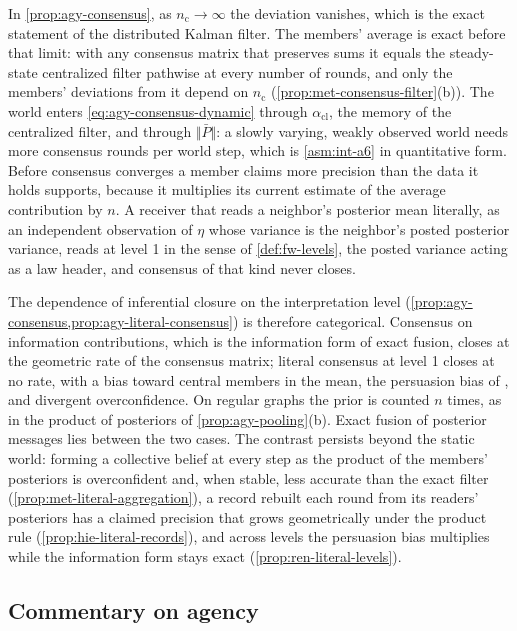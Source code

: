 In \cref{prop:agy-consensus}, as $n_{\mathrm c}\to\infty$ the deviation vanishes, which is the exact statement of the distributed Kalman filter. The members' average is exact before that limit: with any consensus matrix that preserves sums it equals the steady-state centralized filter pathwise at every number of rounds, and only the members' deviations from it depend on $n_{\mathrm c}$ (\cref{prop:met-consensus-filter}(b)). The world enters \eqref{eq:agy-consensus-dynamic} through $\alpha_{\mathrm{cl}}$, the memory of the centralized filter, and through $\Vert\bar P\Vert$: a slowly varying, weakly observed world needs more consensus rounds per world step, which is \cref{asm:int-a6} in quantitative form. Before consensus converges a member claims more precision than the data it holds supports, because it multiplies its current estimate of the average contribution by $n$. A receiver that reads a neighbor's posterior mean literally, as an independent observation of $\eta$ whose variance is the neighbor's posted posterior variance, reads at level 1 in the sense of \cref{def:fw-levels}, the posted variance acting as a law header, and consensus of that kind never closes.

The dependence of inferential closure on the interpretation level (\cref{prop:agy-consensus,prop:agy-literal-consensus}) is therefore categorical. Consensus on information contributions, which is the information form of exact fusion, closes at the geometric rate of the consensus matrix; literal consensus at level 1 closes at no rate, with a bias toward central members in the mean, the persuasion bias of \citet{demarzo2003persuasion}, and divergent overconfidence. On regular graphs the prior is counted $n$ times, as in the product of posteriors of \cref{prop:agy-pooling}(b). Exact fusion of posterior messages lies between the two cases. The contrast persists beyond the static world: forming a collective belief at every step as the product of the members' posteriors is overconfident and, when stable, less accurate than the exact filter (\cref{prop:met-literal-aggregation}), a record rebuilt each round from its readers' posteriors has a claimed precision that grows geometrically under the product rule (\cref{prop:hie-literal-records}), and across levels the persuasion bias multiplies while the information form stays exact (\cref{prop:ren-literal-levels}).

\subsection{Commentary on agency}\label{sup:agy-commentary-on-agency}

